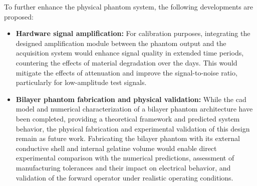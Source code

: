 \documentclass[../00_Main.tex]{subfiles}
\begin{document}
To further enhance the physical phantom system, the following developments are proposed:

\begin{itemize}
    \item \textbf{Hardware signal amplification:} For calibration purposes, integrating the designed amplification module between the phantom output and the acquisition system would enhance signal quality in extended time periods, countering the effects of material degradation over the days. This would mitigate the effects of attenuation and improve the signal-to-noise ratio, particularly for low-amplitude test signals.

    \item \textbf{Bilayer phantom fabrication and physical validation:} While the \gls{cad} model and numerical characterization of a bilayer phantom architecture have been completed, providing a theoretical framework and predicted system behavior, the physical fabrication and experimental validation of this design remain as future work. Fabricating the bilayer phantom with its external conductive shell and internal gelatine volume would enable direct experimental comparison with the numerical predictions, assessment of manufacturing tolerances and their impact on electrical behavior, and validation of the forward operator under realistic operating conditions.
\end{itemize}

\biblio %
\end{document}
